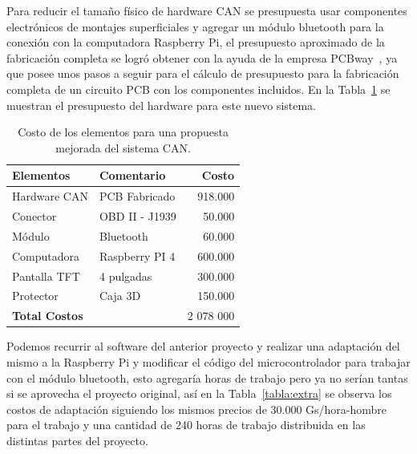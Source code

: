 Para reducir el tamaño físico de hardware CAN se presupuesta usar componentes electrónicos de montajes superficiales y agregar un módulo bluetooth para la conexión con la computadora Raspberry Pi, el presupuesto aproximado de la fabricación completa se logró obtener con la ayuda de la empresa PCBway~\cite{pcbway}, ya que posee unos pasos a seguir para el cálculo de presupuesto para la fabricación completa de un circuito PCB con los componentes incluidos. 
En la Tabla~\ref{tabla:raspberri} se muestran el presupuesto del hardware para este nuevo sistema.
\begin{table}[H]
\begin{center}
\begin{tabular}{ l l r}
\toprule
\textbf{Elementos} & \textbf{Comentario} & \textbf{Costo}  \\ 
\midrule
Hardware CAN    & PCB Fabricado    & 918.000 \\ %
Conector        & OBD II - J1939     & 50.000 \\ %
Módulo          & Bluetooth          & 60.000 \\ %
Computadora     & Raspberry PI 4    & 600.000 \\ %
Pantalla TFT    & 4 pulgadas         & 300.000 \\ %
Protector       & Caja 3D            & 150.000\\ %
\textbf{Total Costos}&  &2 078 000 \\ 
\bottomrule


\end{tabular}
\caption{Costo de los elementos para una propuesta mejorada del sistema CAN.}
\label{tabla:raspberri}
\end{center}
\end{table}


Podemos recurrir al software del anterior proyecto y realizar una adaptación del mismo a la Raspberry Pi y modificar el código del microcontrolador para trabajar con el módulo bluetooth, esto agregaría horas de trabajo pero ya no serían tantas si se aprovecha el proyecto original, así en la Tabla~\ref{tabla:extra} se observa los costos de adaptación siguiendo los mismos precios de 30.000 Gs/hora-hombre para el trabajo y una cantidad de 240 horas de trabajo distribuida en las distintas partes del proyecto.  

